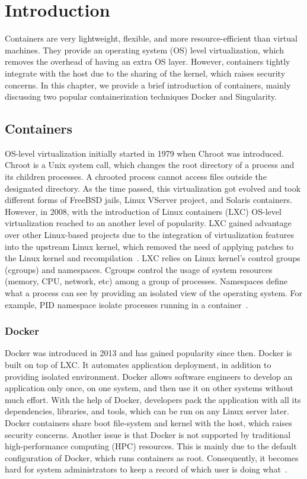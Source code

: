\chapter{Introduction}
Containers are very lightweight, flexible, and more resource-efficient than
virtual machines. They provide an operating system (OS) level virtualization,
which removes the overhead of having an extra OS layer. However, containers
tightly integrate with the host due to the sharing of the kernel, which raises
security concerns. In this chapter, we provide a brief introduction of containers,
mainly discussing two popular containerization techniques Docker and Singularity.

\section{Containers}
OS-level virtualization initially started in 1979 when Chroot was introduced.
Chroot is a Unix system call, which changes the root directory
of a process and its children processes. A chrooted process cannot access files
outside the designated directory.
As the time passed, this virtualization got evolved and took different forms of
FreeBSD jails, Linux VServer project, and Solaris containers. However, in 2008,
with the introduction of Linux containers (LXC) OS-level virtualization reached
to an another level of popularity. LXC gained advantage over
other Linux-based projects due to the integration of virtualization features into
the upstream Linux kernel, which removed the need of applying patches to the
Linux kernel and recompilation~\cite{reshetova2014security}. 
LXC relies on Linux kernel’s control groups (cgroups)
and namespaces. Cgroups control the usage of system resources (memory, CPU,
network, etc) among a group of processes. Namespaces define what a process
can see by providing an isolated view of the operating system. For example,
PID namespace isolate processes running in a container~\cite{bernstein2014containers}.

\subsection{Docker}
Docker was introduced in 2013 and has gained popularity since then. Docker
is built on top of LXC. It automates application deployment, in addition to
providing isolated environment. Docker allows software engineers to develop an
application only once, on one system, and then use it on other systems without
much effort. With the help of Docker, developers pack the application with
all its dependencies, libraries, and tools, which can be run on any Linux server
later. Docker containers share boot file-system and kernel with the host, which
raises security concerns. Another issue is that Docker is not supported by
traditional high-performance computing (HPC) resources. This is mainly due to the
default configuration of Docker, which runs containers as root. Consequently, it
becomes hard for system administrators to keep a record of which user is doing
what~\cite{Containers2017, anderson2015docker}.

